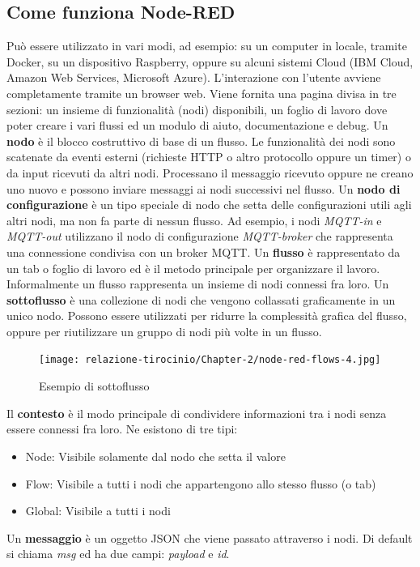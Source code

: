 \documentclass[a4paper,10pt]{memoir}
\begin{document}
\subsection{Come funziona Node-RED}
Può essere utilizzato in vari modi, ad esempio: su un computer in locale, tramite Docker, su un dispositivo Raspberry, oppure su alcuni sistemi Cloud (IBM Cloud, Amazon Web Services, Microsoft Azure).
L'interazione con l'utente avviene completamente tramite un browser web. Viene fornita una pagina divisa in tre sezioni: un insieme di funzionalità (nodi) disponibili, un foglio di lavoro dove poter creare i vari flussi ed un modulo di aiuto, documentazione e debug.
Un \textbf{nodo} è il blocco costruttivo di base di un flusso. Le funzionalità dei nodi sono scatenate da eventi esterni (richieste HTTP o altro protocollo oppure un timer) o da input ricevuti da altri nodi. Processano il messaggio ricevuto oppure ne creano uno nuovo e possono inviare messaggi ai nodi successivi nel flusso. 
Un \textbf{nodo di configurazione} è un tipo speciale di nodo che setta delle configurazioni utili agli altri nodi, ma non fa parte di nessun flusso. Ad esempio, i nodi \textit{MQTT-in} e \textit{MQTT-out} utilizzano il nodo di configurazione \textit{MQTT-broker} che rappresenta una connessione condivisa con un broker MQTT.
Un \textbf{flusso} è rappresentato da un tab o foglio di lavoro ed è il metodo principale per organizzare il lavoro. Informalmente un flusso rappresenta un insieme di nodi connessi fra loro.
Un \textbf{sottoflusso} è una collezione di nodi che vengono collassati graficamente in un unico nodo. Possono essere utilizzati per ridurre la complessità grafica del flusso, oppure per riutilizzare un gruppo di nodi più volte in un flusso.
\begin{figure}[H]
\caption{Esempio di sottoflusso}
\label{fig:sottoflusso}
\texttt{[image: relazione-tirocinio/Chapter-2/node-red-flows-4.jpg]}
\end{figure}
Il \textbf{contesto} è il modo principale di condividere informazioni tra i nodi senza essere connessi fra loro. Ne esistono di tre tipi:
\begin{itemize}
    \item Node: Visibile solamente dal nodo che setta il valore
    \item Flow: Visibile a tutti i nodi che appartengono allo stesso flusso (o tab)
    \item Global: Visibile a tutti i nodi
\end{itemize}
Un \textbf{messaggio} è un oggetto JSON che viene passato attraverso i nodi. Di default si chiama \textit{msg} ed ha due campi: \textit{payload} e \textit{id}. 
\end{document}
